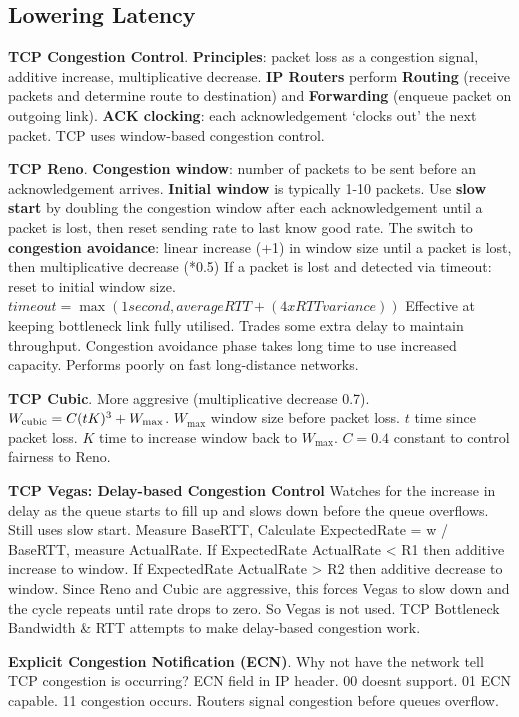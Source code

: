 \documentclass{article}
\begin{document}
\subsection*{Lowering Latency}

\textbf{TCP Congestion Control}.
\textbf{Principles}: packet loss as a congestion signal, additive increase, multiplicative decrease.
\textbf{IP Routers} perform \textbf{Routing} (receive packets and determine route to destination) and
\textbf{Forwarding} (enqueue packet on outgoing link).
\textbf{ACK clocking}: each acknowledgement `clocks out' the next packet.
TCP uses window-based congestion control.

\textbf{TCP Reno}.
\textbf{Congestion window}: number of packets to be sent before an acknowledgement arrives.
\textbf{Initial window} is typically 1-10 packets.
Use \textbf{slow start} by doubling the congestion window after each acknowledgement until a packet is lost,
then reset sending rate to last know good rate.
The switch to \textbf{congestion avoidance}: linear increase (+1) in window size until a packet is lost, then multiplicative decrease (*0.5)
If a packet is lost and detected via timeout: reset to initial window size.
$timeout = \max(1 second, average RTT + (4 x RTT variance))$
Effective at keeping bottleneck link fully utilised.
Trades some extra delay to maintain throughput.
Congestion avoidance phase takes long time to use increased capacity.
Performs poorly on fast long-distance networks.

\textbf{TCP Cubic}.
More aggresive (multiplicative decrease 0.7).
$W_{\text{cubic}} = C (t \- K)^3 + W_{\text{max}}$.
$W_{\text{max}}$ window size before packet loss.
$t$ time since packet loss.
$K$ time to increase window back to $W_{\text{max}}$.
$C = 0.4$ constant to control fairness to Reno.

\textbf{TCP Vegas: Delay-based Congestion Control}
Watches for the increase in delay as the queue starts to fill up and slows down before the queue overflows.
Still uses slow start.
Measure BaseRTT, Calculate ExpectedRate = w / BaseRTT, measure ActualRate.
If ExpectedRate \- ActualRate < R1 then additive increase to window.
If ExpectedRate \- ActualRate > R2 then additive decrease to window.
Since Reno and Cubic are aggressive, this forces Vegas to slow down and the cycle repeats until rate drops to zero.
So Vegas is not used. TCP Bottleneck Bandwidth \& RTT attempts to make delay-based congestion work.

\textbf{Explicit Congestion Notification (ECN)}.
Why not have the network tell TCP congestion is occurring? ECN field in IP header.
00 doesnt support.
01 ECN capable.
11 congestion occurs.
Routers signal congestion before queues overflow.
\end{document}
